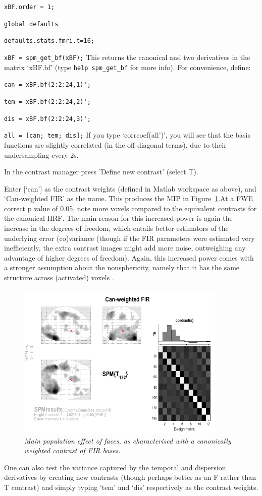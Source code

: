 \item{\verb!xBF.order = 1;!}
\item{\verb!global defaults!}
\item{\verb!defaults.stats.fmri.t=16;!}
\item{\verb!xBF = spm_get_bf(xBF);!}
\ei
This returns the canonical and two derivatives in the matrix `xBF.bf' (type \verb!help spm_get_bf! for more info). For convenience, define:
\bi
\item{\verb!can = xBF.bf(2:2:24,1)';!}
\item{\verb!tem = xBF.bf(2:2:24,2)';!}
\item{\verb!dis = xBF.bf(2:2:24,3)';!}
\item{\verb!all = [can; tem; dis];!}
\ei
If you type `corrcoef(all')', you will see that the basis functions are slightly correlated (in the off-diagonal terms), due to their undersampling every 2s.
\bi
\item{In the contrast manager press 'Define new contrast' (select T).}
\item{Enter [`can'] as the contrast weights (defined in Matlab workspace as above), and `Can-weighted FIR' as the name.}
\ei
This produces the MIP in Figure~\ref{can_weighted_fir}.At a FWE correct p value of 0.05, note more voxels compared to the equivalent contrasts for the canonical HRF. The main reason for this increased power is again the increase in the degrees of freedom, which entails better estimators of the underlying error (co)variance (though if the FIR parameters were estimated very inefficiently, the extra contrast images might add more noise, outweighing any advantage of higher degrees of freedom). Again, this increased power comes with a stronger assumption about the nonsphericity, namely that it has the same structure across (activated) voxels \cite{daniel_hbf2}.
\begin{figure}
\begin{center}
\includegraphics[width=100mm]{can_weighted_fir}
\caption{\em Main population effect of faces, as characterised with a canonically weighted contrast of FIR bases. \label{can_weighted_fir}}
\end{center}
\end{figure}
One can also test the variance captured by the temporal and dispersion derivatives by creating new contrasts (though perhaps better as an F rather than T contrast) and simply typing `tem' and `dis' respectively as the contrast weights.

